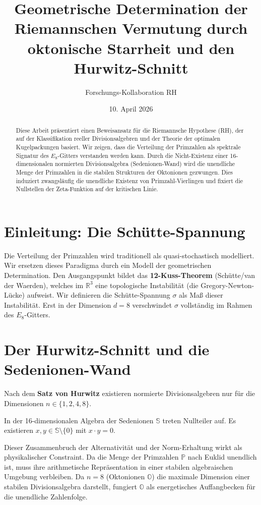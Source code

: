 \documentclass[12pt,a4paper]{article}
\title{Geometrische Determination der Riemannschen Vermutung durch oktonische Starrheit und den Hurwitz-Schnitt}
\author{Forschungs-Kollaboration RH}
\date{10. April 2026}
\begin{document}
	
	\maketitle
	
	\begin{abstract}
		Diese Arbeit präsentiert einen Beweisansatz für die Riemannsche Hypothese (RH), der auf der Klassifikation reeller Divisionsalgebren und der Theorie der optimalen Kugelpackungen basiert. Wir zeigen, dass die Verteilung der Primzahlen als spektrale Signatur des $E_8$-Gitters verstanden werden kann. Durch die Nicht-Existenz einer 16-dimensionalen normierten Divisionsalgebra (Sedenionen-Wand) wird die unendliche Menge der Primzahlen in die stabilen Strukturen der Oktonionen gezwungen. Dies induziert zwangsläufig die unendliche Existenz von Primzahl-Vierlingen und fixiert die Nullstellen der Zeta-Funktion auf der kritischen Linie.
	\end{abstract}
	
	\section{Einleitung: Die Schütte-Spannung}
	Die Verteilung der Primzahlen wird traditionell als quasi-stochastisch modelliert. Wir ersetzen dieses Paradigma durch ein Modell der geometrischen Determination. Den Ausgangspunkt bildet das \textbf{12-Kuss-Theorem} (Schütte/van der Waerden), welches im $\mathbb{R}^3$ eine topologische Instabilität (die Gregory-Newton-Lücke) aufweist. Wir definieren die Schütte-Spannung $\sigma$ als Maß dieser Instabilität. Erst in der Dimension $d=8$ verschwindet $\sigma$ vollständig im Rahmen des $E_8$-Gitters.
	
	\section{Der Hurwitz-Schnitt und die Sedenionen-Wand}
	Nach dem \textbf{Satz von Hurwitz} existieren normierte Divisionsalgebren nur für die Dimensionen $n \in \{1, 2, 4, 8\}$. 
	
	\begin{lemma}
		In der 16-dimensionalen Algebra der Sedenionen $\mathbb{S}$ treten Nullteiler auf. Es existieren $x, y \in \mathbb{S} \setminus \{0\}$ mit $x \cdot y = 0$. 
	\end{lemma}
	
	Dieser Zusammenbruch der Alternativität und der Norm-Erhaltung wirkt als physikalischer Constraint. Da die Menge der Primzahlen $\mathbb{P}$ nach Euklid unendlich ist, muss ihre arithmetische Repräsentation in einer stabilen algebraischen Umgebung verbleiben. Da $n=8$ (Oktonionen $\mathbb{O}$) die maximale Dimension einer stabilen Divisionsalgebra darstellt, fungiert $\mathbb{O}$ als energetisches Auffangbecken für die unendliche Zahlenfolge.
	
\end{document}
